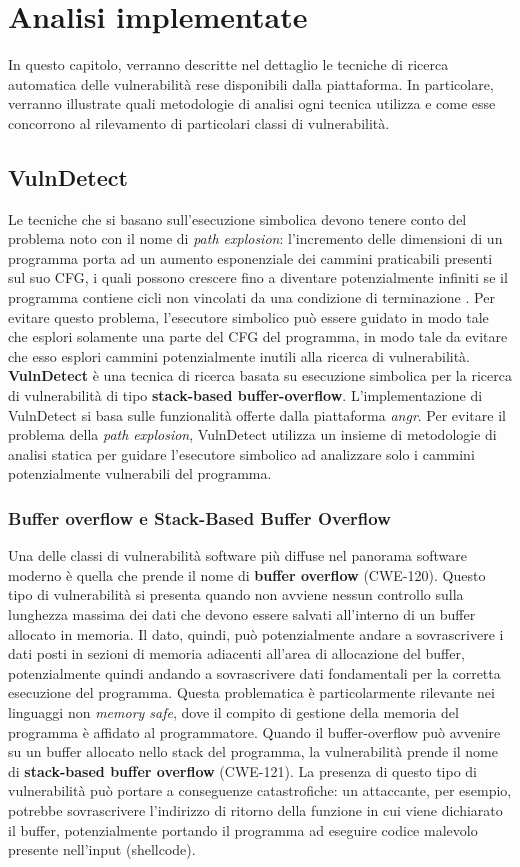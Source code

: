 \documentclass[../main.tex]{subfiles}
\begin{document}
\chapter{Analisi implementate}
In questo capitolo, verranno descritte nel dettaglio le tecniche di ricerca automatica delle vulnerabilità rese disponibili dalla piattaforma.
In particolare, verranno illustrate quali metodologie di analisi ogni tecnica utilizza e come esse concorrono al rilevamento
di particolari classi di vulnerabilità.
\section{VulnDetect}
Le tecniche che si basano sull'esecuzione simbolica devono tenere conto del problema noto con il nome di \textit{path explosion}: l'incremento delle
dimensioni di un programma porta ad un aumento esponenziale dei cammini praticabili presenti sul suo CFG, i quali possono crescere fino a diventare
potenzialmente infiniti se il programma contiene cicli non vincolati da una condizione di terminazione \cite{SE_Path_explosion}. 
Per evitare questo problema, l'esecutore simbolico può essere guidato in modo tale che esplori solamente una parte del CFG del programma, in modo tale da evitare che esso
esplori cammini potenzialmente inutili alla ricerca di vulnerabilità. \textbf{VulnDetect} \cite{VulnDetect} è una tecnica di ricerca basata su esecuzione simbolica per la ricerca
di vulnerabilità di tipo \textbf{stack-based buffer-overflow}. L'implementazione di VulnDetect si basa sulle funzionalità offerte dalla piattaforma \textit{angr}.
Per evitare il problema della \textit{path explosion}, VulnDetect utilizza un insieme di metodologie di analisi statica per guidare
l'esecutore simbolico ad analizzare solo i cammini potenzialmente vulnerabili del programma.
\subsection{Buffer overflow e Stack-Based Buffer Overflow}
Una delle classi di vulnerabilità software più diffuse nel panorama software moderno è quella che prende il nome di \textbf{buffer overflow} (CWE-120).
Questo tipo di vulnerabilità si presenta quando non avviene nessun controllo sulla lunghezza massima dei dati che devono essere salvati all'interno
di un buffer allocato in memoria. Il dato, quindi, può potenzialmente andare a sovrascrivere i dati posti in sezioni di memoria adiacenti all'area di allocazione
del buffer, potenzialmente quindi andando a sovrascrivere dati fondamentali per la corretta esecuzione del programma. 
Questa problematica è particolarmente rilevante nei linguaggi non \textit{memory safe}, dove il compito di gestione della memoria del programma è affidato
al programmatore. Quando il buffer-overflow può avvenire su un buffer allocato nello stack del programma, la vulnerabilità prende il nome di \textbf{stack-based buffer overflow} (CWE-121).
La presenza di questo tipo di vulnerabilità può portare a conseguenze catastrofiche: un attaccante, per esempio, potrebbe sovrascrivere l'indirizzo di ritorno della funzione in cui viene dichiarato il buffer, 
potenzialmente portando il programma ad eseguire codice malevolo presente nell'input (shellcode).
\end{document}
